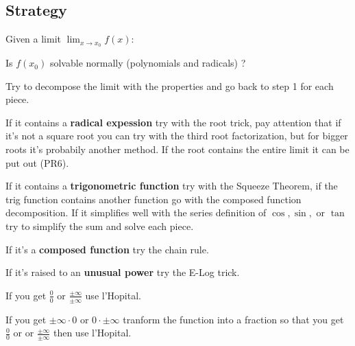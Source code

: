 \documentclass[8pt,a4paper]{extarticle}     %
\theoremstyle{definition}
\theoremstyle{definition}
\theoremstyle{definition}
\begin{document}
\begin{multicols}{4}
\subsection{Strategy}
Given a limit $\displaystyle\lim_{x \to x_0}f(x)$:
\begin{numberlist}
	\item Is $f(x_0)$ solvable normally (polynomials and radicals) ?
	\item Try to decompose the limit with the properties and go back to step 1 for each piece.
	\item If it contains a \textbf{radical expession} try with the root trick, pay attention that if it's not a square root you can try with the third root factorization, but for bigger roots it's probabily another method. If the root contains the entire limit it can be put out (PR6).
	\item If it contains a \textbf{trigonometric function} try with the Squeeze Theorem, if the trig function contains another function go with the composed function decomposition. If it simplifies well with the series definition of $\cos,\sin,$ or $\tan$ try to simplify the sum and solve each piece.
	\item If it's a \textbf{composed function} try the chain rule.
	\item If it's raised to an \textbf{unusual power} try the E-Log trick. 
	\item If you get $\frac{0}{0}$ or $\frac{\pm\infty}{\pm\infty}$ use l'Hopital. 
	\item If you get $\pm\infty\cdot 0$ or $0\cdot\pm\infty$ tranform the function into a fraction so that you get $\frac{0}{0}$ or or $\frac{\pm\infty}{\pm\infty}$ then use l'Hopital. 

\end{numberlist}


\end{multicols}
\end{document}
